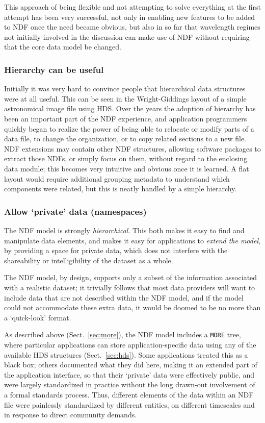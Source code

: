 \documentclass[final,authoryear,5p,times,twocolumn]{elsarticle}
\newcommand*\secref[1]{Sect.~\ref{#1}}
\begin{document}
This approach of being flexible and not attempting to solve everything
at the first attempt has been very successful, not only in enabling new
features to be added to NDF once the need became obvious, but also
in so far that wavelength regimes not initially involved in the
discussion can make use of NDF without requiring that the core data
model be changed.

\subsubsection{Hierarchy can be useful}

Initially it was very hard to convince people that hierarchical data
structures were at all useful. This can be seen in the Wright-Giddings
layout of a simple astronomical image file using HDS. Over the years
the adoption of hierarchy has been an important part of the NDF
experience, and application programmers quickly began to realize the power of
being able to relocate or modify parts of a data file,
to change the organization, or to copy related sections to a new file.
NDF extensions may contain other NDF structures, allowing
software packages to extract those NDFs, or simply focus on them,
without regard to the enclosing data module; this becomes very intuitive and
obvious once it is learned. A flat layout would require additional
grouping metadata to understand which components were related, but this
is neatly handled by a simple hierarchy.

\subsubsection{Allow `private' data (namespaces)}

The NDF model is strongly \emph{hierarchical}.  This both makes it
easy to find and manipulate data elements, and makes it easy for
applications to \emph{extend the model}, by providing a space for
private data, which does not interfere with the shareability or
intelligibility of the dataset as a whole.

The NDF model, by design, supports only a subset of the information
associated with a realistic dataset; it trivially follows that most
data providers will want to include data that are not described within
the NDF model, and if the model could not accommodate these extra
data, it would be doomed to be no more than a `quick-look' format.

As described above (\secref{sec:more}), the NDF model includes a
\texttt{MORE} tree, where particular applications can store
application-specific data using any of the available HDS structures
(\secref{sec:hds}).  Some applications treated this as a black box;
others documented what they did here, making it an extended part of
the application interface, so that their `private' data were effectively
public, and were largely standardized in practice without the long
drawn-out involvement of a formal standards process.  Thus, different
elements of the data within an NDF file were painlessly standardized
by different entities, on different timescales and in response to
direct community demands.
\end{document}
